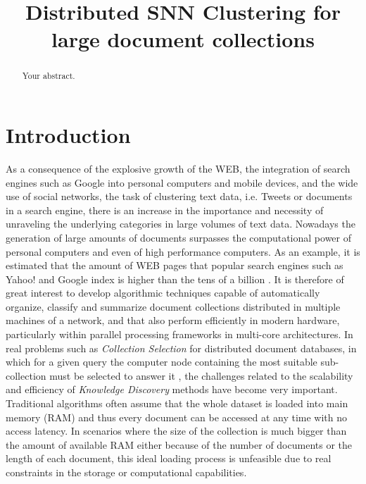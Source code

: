\documentclass[a4paper]{article}
\title{Distributed SNN Clustering for large document collections}
\begin{document}
\maketitle

\begin{abstract}
Your abstract.
\end{abstract}

\section{Introduction}
As a consequence of the explosive growth of the WEB, the integration of search engines such as Google into personal computers and mobile devices, and the wide use of social networks, the task of clustering text data, i.e. Tweets or documents in a search engine, there is an increase in the importance and necessity of unraveling the underlying categories in large volumes of text data. Nowadays the generation of large amounts of documents surpasses the computational power of personal computers and even of high performance computers.
As an example, it is estimated that the amount of WEB pages that popular search engines such as Yahoo! and Google index is higher than the tens of a billion \cite{www}.
It is therefore of great interest to develop algorithmic techniques capable of automatically organize, classify and summarize document collections distributed in multiple machines of a network, and that also perform efficiently in modern hardware, particularly within parallel processing frameworks in multi-core architectures. In real problems such as \textit{Collection Selection} for distributed document databases, in which for a given query the computer node containing the most suitable sub-collection must be selected to answer it \cite{CM13}, the challenges related to the scalability and efficiency of \textit{Knowledge Discovery} methods have become very important. Traditional algorithms often assume that the whole dataset is loaded into main memory (RAM) and thus every document can be accessed at any time with no access latency. In scenarios where the size of the collection is much bigger than the amount of available RAM either because of the number of documents or the length of each document, this ideal loading process is unfeasible due to real constraints in the storage or computational capabilities.
\end{document}
